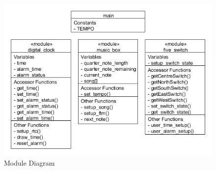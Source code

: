 \documentclass[a4paper]{article}
\begin{document}
\newpage
\begin{figure}
\centering
\includegraphics[width=150mm]{module_diagram.png}
\caption{Module Diagram}
\label{overflow}
\end{figure}
\end{document}

